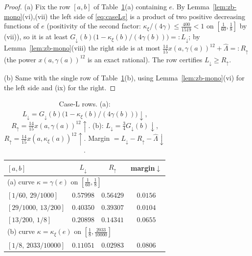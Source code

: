 \documentclass[11pt]{article}
\theoremstyle{remark}
\theoremstyle{plain}
\theoremstyle{plain}
\newcommand{\kxi}{\kappa_\xi}
\begin{document}
\begin{proof}
(a) Fix the row $[a,b]$ of Table~\ref{tab:caseL}(a) containing $e$.  By
Lemma~\ref{lem:zb-mono}(vi),(vii) the left side of \eqref{eq:caseLg} is a
product of two positive decreasing functions of $e$ (positivity of the
second factor: $\kxi/(4\gamma)\le\tfrac{400}{1519}<1$ on
$[\tfrac1{60},\tfrac18]$ by (vii)), so it is at least
$G_\downarrow(b)\bigl(1-\kxi(b)/(4\gamma(b))\bigr)=:L_\downarrow$; by
Lemma~\ref{lem:zb-mono}(viii) the right side is at most
$\tfrac{14}{15}x(a,\gamma(a))^{12}+\widehat\Lambda=:R_\uparrow$ (the power
$x(a,\gamma(a))^{12}$ is an exact rational).  The row certifies
$L_\downarrow\ge R_\uparrow$.

(b) Same with the single row of Table~\ref{tab:caseL}(b), using
Lemma~\ref{lem:zb-mono}(vi) for the left side and (ix) for the right.
\end{proof}

\begin{table}[h]\centering
\caption{Case-L rows.  (a): $L_\downarrow=G_\downarrow(b)\bigl(1-
\kxi(b)/(4\gamma(b))\bigr)\downarrow$,
$R_\uparrow=\tfrac{14}{15}x(a,\gamma(a))^{12}\uparrow$.
(b): $L_\downarrow=\tfrac34G_\downarrow(b)\downarrow$,
$R_\uparrow=\tfrac{14}{15}x(a,\kxi(a))^{12}\uparrow$.
Margin $=L_\downarrow-R_\uparrow-\widehat\Lambda\downarrow$.}\label{tab:caseL}
\begin{tabular}{lccc}
\toprule
$[a,b]$ & $L_\downarrow$ & $R_\uparrow$ & margin$\downarrow$\\
\midrule
\multicolumn{4}{l}{(a) curve $\kappa=\gamma(e)$ on $[\tfrac1{60},\tfrac18]$}\\
$[1/60,\,29/1000]$ & $0.57998$ & $0.56429$ & $0.0156$ \\
$[29/1000,\,13/200]$ & $0.40350$ & $0.39307$ & $0.0104$ \\
$[13/200,\,1/8]$ & $0.20898$ & $0.14341$ & $0.0655$ \\
\midrule
\multicolumn{4}{l}{(b) curve $\kappa=\kxi(e)$ on $[\tfrac18,\tfrac{2033}{10000}]$}\\
$[1/8,\,2033/10000]$ & $0.11051$ & $0.02983$ & $0.0806$ \\
\bottomrule
\end{tabular}
\end{table}
\end{document}
